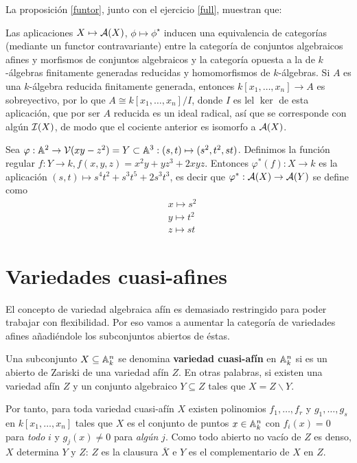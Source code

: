 \documentclass[ACGA.tex]{subfiles}
\begin{document}
La proposición \ref{funtor}, junto con el ejercicio \ref{full}, muestran que:

\begin{coro}\label{equivafin}
 Las aplicaciones $X\mapsto \mathcal{A}(X)$, $\phi\mapsto \phi^\star$ inducen una equivalencia de categorías (mediante un functor contravariante) entre la categoría de conjuntos algebraicos afines y morfismos de conjuntos algebraicos y la categoría opuesta a la de $k$-álgebras finitamente generadas reducidas y homomorfismos de $k$-álgebras. Si $A$ es una $k$-álgebra reducida finitamente generada, entonces $k[x_1,\dots,x_n]\to A$ es sobreyectivo, por lo que $A\cong k[x_1,\dots,x_n]/I$, donde $I$ es lel $\ker$ de esta aplicación, que por ser $A$ reducida es un ideal radical, así que se corresponde con algún $\mathcal{I}(X)$, de modo que el cociente anterior es isomorfo a $\mathcal{A}(X)$.
\end{coro}

\begin{ej}
Sea $\varphi:\mathbb{A}^2\to\mathcal{V}(xy-z^2)=Y\subset\mathbb{A}^3: (s,t)\mapsto(s^2,t^2,st)$. Definimos la función regular $f:Y\to k, f(x,y,z)=x^2y+yz^3+2xyz$. Entonces $\varphi^*(f):X\to k$ es la aplicación $(s,t)\mapsto s^4t^2+s^3t^5+2s^3t^3$, es decir que
$\varphi^*:\mathcal{A}(X)\to\mathcal{A}(Y)$ se define como 
\begin{align*}
&x\mapsto s^2\\
&y\mapsto t^2\\
&z\mapsto st
\end{align*}
\end{ej}

\section{Variedades cuasi-afines}

El concepto de variedad algebraica afín es demasiado restringido para poder trabajar con flexibilidad. Por eso vamos a aumentar la categoría de variedades afines añadiéndole los subconjuntos abiertos de éstas.

\begin{defi}
 Una subconjunto $X\subseteq\mathbb{A}^n_k$ se denomina {\bf variedad cuasi-afín} en $\mathbb{A}^n_k$ si es un abierto de Zariski de una variedad afín $Z$. En otras palabras, si existen una variedad afín $Z$ y un conjunto algebraico $Y\subseteq Z$ tales que $X=Z\backslash Y$. 
\end{defi}

Por tanto, para toda variedad cuasi-afín $X$ existen polinomios $f_1,\ldots,f_r$ y $g_1,\ldots,g_s$ en $k[x_1,\ldots,x_n]$ tales que $X$ es el conjunto de puntos $x\in\mathbb{A}^n_k$ con $f_i(x)=0$ para \emph{todo} $i$ y $g_j(x)\neq 0$ para \emph{algún} $j$.
Como todo abierto no vacío de $Z$ es denso, $X$ determina $Y$ y $Z$: $Z$ es la clausura $\overline X$ e $Y$ es el complementario de $X$ en $Z$.
\end{document}
